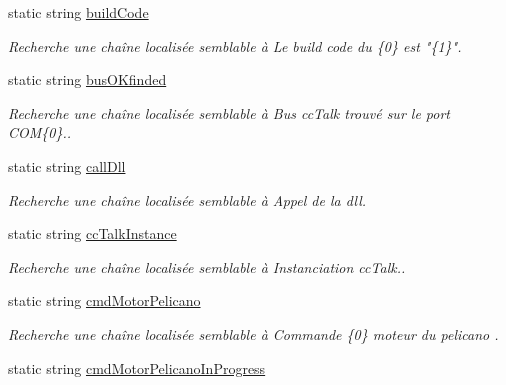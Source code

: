 \begin{DoxyCompactItemize}
static string \mbox{\hyperlink{class_device_library_1_1messages_text_a755549427f23616566b9993e8ea52a22}{build\+Code}}
\begin{DoxyCompactList}\small\item\em Recherche une chaîne localisée semblable à Le build code du \{0\} est "\{1\}". \end{DoxyCompactList}\item 
static string \mbox{\hyperlink{class_device_library_1_1messages_text_aae08998942f40ad4e17d68f70572f27b}{bus\+O\+Kfinded}}
\begin{DoxyCompactList}\small\item\em Recherche une chaîne localisée semblable à Bus cc\+Talk trouvé sur le port C\+OM\{0\}.. \end{DoxyCompactList}\item 
static string \mbox{\hyperlink{class_device_library_1_1messages_text_a5aba326853a8c8f79f70053306ee819c}{call\+Dll}}
\begin{DoxyCompactList}\small\item\em Recherche une chaîne localisée semblable à Appel de la dll. \end{DoxyCompactList}\item 
static string \mbox{\hyperlink{class_device_library_1_1messages_text_adc962171c994c63312d316f13b046d2c}{cc\+Talk\+Instance}}
\begin{DoxyCompactList}\small\item\em Recherche une chaîne localisée semblable à Instanciation cc\+Talk.. \end{DoxyCompactList}\item 
static string \mbox{\hyperlink{class_device_library_1_1messages_text_ac961f592dd67ea083a505482617c823b}{cmd\+Motor\+Pelicano}}
\begin{DoxyCompactList}\small\item\em Recherche une chaîne localisée semblable à Commande \{0\} moteur du pelicano . \end{DoxyCompactList}\item 
static string \mbox{\hyperlink{class_device_library_1_1messages_text_aa5a99445dd360fad1b310b74d9be7bf6}{cmd\+Motor\+Pelicano\+In\+Progress}}

\end{DoxyCompactItemize}
